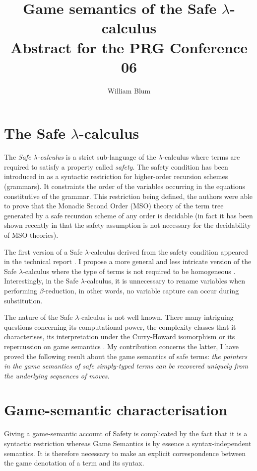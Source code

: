 \documentclass[12pt]{article}
\author{William Blum}
\title{Game semantics of the Safe $\lambda$-calculus\\ {\small Abstract for the PRG Conference 06}}
\begin{document}
\maketitle

\section{The Safe $\lambda$-calculus}

The \emph{Safe $\lambda$-calculus} is a strict sub-language of the
$\lambda$-calculus where terms are required to satisfy a property
called \emph{safety}. The safety condition has been introduced in
\cite{KNU02} as a syntactic restriction for higher-order recursion
schemes (grammars). It constraints the order of the variables
occurring in the equations constitutive of the grammar. This
restriction being defined, the authors were able to prove that the
Monadic Second Order (MSO) theory of the term tree generated by a
safe recursion scheme of any order is decidable (in fact it has been
shown recently in \cite{OngLics2006} that the safety assumption is
not necessary for the decidability of MSO theories).

The first version of a Safe $\lambda$-calculus derived from the
safety condition appeared in the technical report
\cite{safety-mirlong2004}. I propose a more general and less
intricate version of the Safe $\lambda$-calculus where the type of
terms is not required to be homogeneous \citep{blumtransfer}.
Interestingly, in the Safe $\lambda$-calculus, it is unnecessary to
rename variables when performing $\beta$-reduction, in other words,
no variable capture can occur during substitution.

The nature of the Safe $\lambda$-calculus is not well known. There
many intriguing questions concerning its computational power, the
complexity classes that it characterises, its interpretation under
the Curry-Howard isomorphism or its repercussion on game semantics
\citep{abramsky:game-semantics-tutorial}. My contribution concerns
the latter, I have proved the following result about the game
semantics of safe terms: \emph{the pointers in the game semantics of
safe simply-typed terms can be recovered uniquely from the
underlying sequences of moves}.

\section{Game-semantic characterisation}
Giving a game-semantic account of Safety is complicated by the fact
that it is a syntactic restriction whereas Game Semantics is by
essence a syntax-independent semantics. It is therefore necessary to
make an explicit correspondence between the game denotation of a
term and its syntax.
\end{document}
